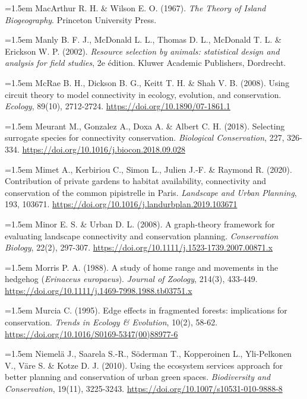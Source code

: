 \documentclass[a4paper,12pt]{report}
\begin{document}
\noindent\hangindent=1.5em MacArthur R. H. \& Wilson E. O. (1967). \textit{The Theory of Island Biogeography}. Princeton University Press.\par\medskip
\noindent\hangindent=1.5em Manly B. F. J., McDonald L. L., Thomas D. L., McDonald T. L. \& Erickson W. P. (2002). \textit{Resource selection by animals: statistical design and analysis for field studies}, 2e édition. Kluwer Academic Publishers, Dordrecht.\par\medskip
\noindent\hangindent=1.5em McRae B. H., Dickson B. G., Keitt T. H. \& Shah V. B. (2008). Using circuit theory to model connectivity in ecology, evolution, and conservation. \textit{Ecology}, 89(10), 2712-2724. \url{https://doi.org/10.1890/07-1861.1}\par\medskip
\noindent\hangindent=1.5em Meurant M., Gonzalez A., Doxa A. \& Albert C. H. (2018). Selecting surrogate species for connectivity conservation. \textit{Biological Conservation}, 227, 326-334. \url{https://doi.org/10.1016/j.biocon.2018.09.028}\par\medskip
\noindent\hangindent=1.5em Mimet A., Kerbiriou C., Simon L., Julien J.-F. \& Raymond R. (2020). Contribution of private gardens to habitat availability, connectivity and conservation of the common pipistrelle in Paris. \textit{Landscape and Urban Planning}, 193, 103671. \url{https://doi.org/10.1016/j.landurbplan.2019.103671}\par\medskip
\noindent\hangindent=1.5em Minor E. S. \& Urban D. L. (2008). A graph-theory framework for evaluating landscape connectivity and conservation planning. \textit{Conservation Biology}, 22(2), 297-307. \url{https://doi.org/10.1111/j.1523-1739.2007.00871.x}\par\medskip
\noindent\hangindent=1.5em Morris P. A. (1988). A study of home range and movements in the hedgehog (\textit{Erinaceus europaeus}). \textit{Journal of Zoology}, 214(3), 433-449. \url{https://doi.org/10.1111/j.1469-7998.1988.tb03751.x}\par\medskip
\noindent\hangindent=1.5em Murcia C. (1995). Edge effects in fragmented forests: implications for conservation. \textit{Trends in Ecology \& Evolution}, 10(2), 58-62. \url{https://doi.org/10.1016/S0169-5347(00)88977-6}\par\medskip
\noindent\hangindent=1.5em Niemelä J., Saarela S.-R., Söderman T., Kopperoinen L., Yli-Pelkonen V., Väre S. \& Kotze D. J. (2010). Using the ecosystem services approach for better planning and conservation of urban green spaces. \textit{Biodiversity and Conservation}, 19(11), 3225-3243. \url{https://doi.org/10.1007/s10531-010-9888-8}\par\medskip
\end{document}
